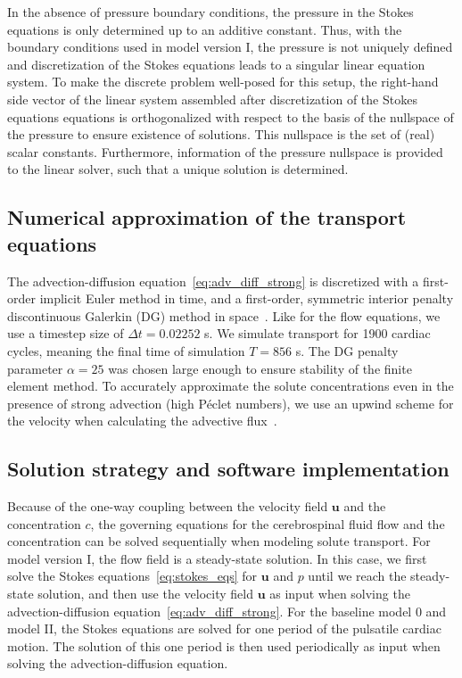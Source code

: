 \documentclass[fleqn]{wlscirep}
\newcommand{\uu}{\mathbf{u}}
\begin{document}
In the absence of pressure boundary conditions, the pressure in the Stokes equations is only determined up to an additive constant. Thus, with the boundary conditions used in model version I, the pressure is not uniquely defined and discretization of the Stokes equations leads to a singular linear equation system. To make the discrete problem well-posed for this setup, the right-hand side vector of the linear system assembled after discretization of the Stokes equations equations is orthogonalized with respect to the basis of the nullspace of the pressure to ensure existence of solutions. This nullspace is the set of (real) scalar constants. Furthermore, information of the pressure nullspace is provided to the linear solver, such that a unique solution is determined.

\subsection*{Numerical approximation of the transport equations}
The advection-diffusion equation~\eqref{eq:adv_diff_strong} is discretized with a first-order implicit Euler method in time, and a first-order, symmetric interior penalty discontinuous Galerkin (DG) method in space~\cite{Arnold1982AnElements}. Like for the flow equations, we use a timestep size of $\Delta t = 0.02252$ s. We simulate transport for 1900 cardiac cycles, meaning the final time of simulation $T = 856$ s. The DG penalty parameter $\alpha = 25$ was chosen large enough to ensure stability of the finite element method. To accurately approximate the solute concentrations even in the presence of strong advection (high Péclet numbers), we use an upwind scheme for the velocity when calculating the advective flux~\cite{Patankar2018NumericalFlow}. 

\subsection*{Solution strategy and software implementation}
Because of the one-way coupling between the velocity field $\uu$ and the concentration $c$, the governing equations for the cerebrospinal fluid flow and the concentration can be solved sequentially when modeling solute transport. For model version I, the flow field is a steady-state solution. In this case, we first solve the Stokes equations~\eqref{eq:stokes_eqs} for $\uu$ and $p$ until we reach the steady-state solution, and then use the velocity field $\uu$ as input when solving the advection-diffusion equation~\eqref{eq:adv_diff_strong}. For the baseline model 0 and model II, the Stokes equations are solved for one period of the pulsatile cardiac motion. The solution of this one period is then used periodically as input when solving the advection-diffusion equation.
\end{document}
